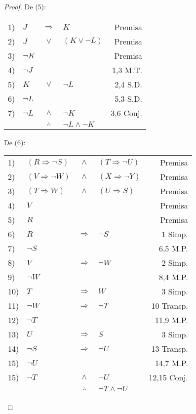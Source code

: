\documentclass[12pt]{report}
\theoremstyle{largebreak}
\begin{document}
\begin{proof}
        De (5):
        \begin{center}
            \begin{tabular}{l l c l r}
                1) & $J$ & $\Rightarrow$ & $K$ & Premisa \\
                2) & $J$ & $\lor$ & $(K\lor\neg L)$ & Premisa \\
                3) & $\neg K$ &  &  & Premisa \\
                4) & $\neg J$ &  &  & 1,3 M.T. \\
                5) & $K$ & $\lor$ & $\neg L$ & 2,4 S.D.\\
                6) & $\neg L$ &  &  & 5,3 S.D.\\
                7) & $\neg L$ & $\land$ & $\neg K$ & 3,6 Conj.\\
                \hline
                & & $\therefore$ & $\neg L\land \neg K$  & \\
            \end{tabular}
        \end{center}

        De (6):
        \begin{center}
            \begin{tabular}{l l c l r}
                1) & $(R\Rightarrow\neg S)$ & $\land$ & $(T\Rightarrow\neg U)$ & Premisa \\
                2) & $(V\Rightarrow\neg W)$ & $\land$ & $(X\Rightarrow\neg Y)$ & Premisa \\
                3) & $(T\Rightarrow W)$ & $\land$ & $(U\Rightarrow S)$ & Premisa \\
                4) & $V$ &  &  & Premisa \\
                5) & $R$ &  &  & Premisa \\
                6) & $R$ & $\Rightarrow$ & $\neg S$ & 1 Simp. \\
                7) & $\neg S$ &  &  & 6,5 M.P. \\
                8) & $V$ & $\Rightarrow$ & $\neg W$ & 2 Simp. \\
                9) & $\neg W$ &  &  & 8,4 M.P. \\
                10) & $T$ & $\Rightarrow$ & $ W$ & 3 Simp. \\
                11) & $\neg W$ & $\Rightarrow$ & $\neg T$ & 10 Transp. \\
                12) & $\neg T$ &  &  & 11,9 M.P. \\
                13) & $U$ & $\Rightarrow$ & $S$ & 3 Simp. \\
                14) & $\neg S$ & $\Rightarrow$ & $\neg U$ & 13 Transp. \\
                15) & $\neg U$ &  &  & 14,7 M.P. \\
                15) & $\neg T$ & $\land$ & $\neg U$ & 12,15 Conj. \\
                \hline
                & & $\therefore$ & $\neg T\land \neg U$  & \\
            \end{tabular}
        \end{center}

    \end{proof}
\end{document}
